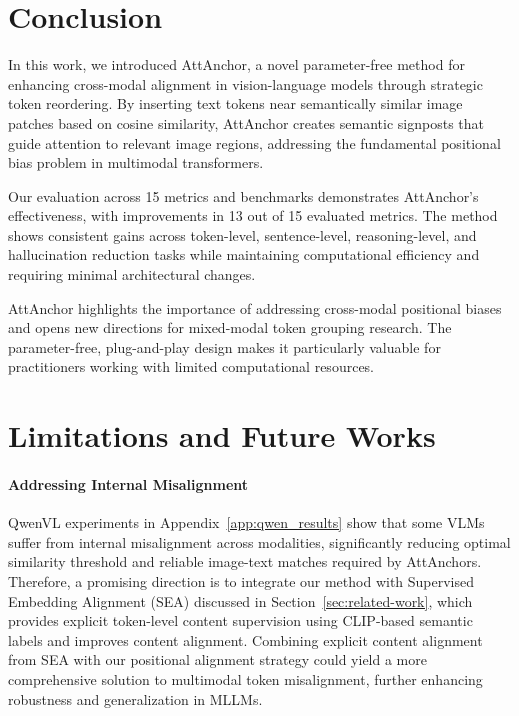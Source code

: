 \documentclass[11pt]{article}
\begin{document}
\section{Conclusion}

In this work, we introduced AttAnchor, a novel parameter-free method for enhancing cross-modal alignment in vision-language models through strategic token reordering. By inserting text tokens near semantically similar image patches based on cosine similarity, AttAnchor creates semantic signposts that guide attention to relevant image regions, addressing the fundamental positional bias problem in multimodal transformers.

Our evaluation across 15 metrics and benchmarks demonstrates AttAnchor's effectiveness, with improvements in 13 out of 15 evaluated metrics. The method shows consistent gains across token-level, sentence-level, reasoning-level, and hallucination reduction tasks while maintaining computational efficiency and requiring minimal architectural changes.

AttAnchor highlights the importance of addressing cross-modal positional biases and opens new directions for mixed-modal token grouping research. The parameter-free, plug-and-play design makes it particularly valuable for practitioners working with limited computational resources.
\vspace{-0.2cm}
\section{Limitations and Future Works}

\paragraph{Addressing Internal Misalignment}
QwenVL experiments in Appendix~\ref{app:qwen_results} show that some VLMs suffer from internal misalignment across modalities, significantly reducing  optimal similarity threshold and reliable image-text matches required by AttAnchors. Therefore, a promising direction is to integrate our method with Supervised Embedding Alignment (SEA) discussed in  Section~\ref{sec:related-work}, which provides explicit token-level content supervision using CLIP-based semantic labels and improves content alignment. Combining explicit content alignment from SEA with our positional alignment strategy could yield a more comprehensive solution to multimodal token misalignment, further enhancing robustness and generalization in MLLMs.
\end{document}
